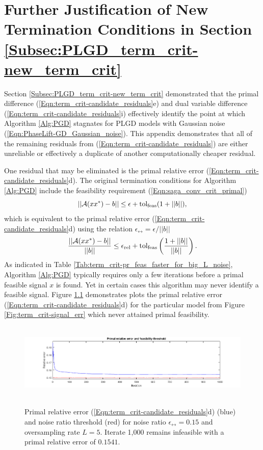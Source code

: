 \chapter{Further Justification of New Termination Conditions in Section \ref{Subsec:PLGD_term_crit-new_term_crit}}      		\label{Sec:Appx-further_reasons_for_new_term_crit}



Section \ref{Subsec:PLGD_term_crit-new_term_crit} demonstrated that the primal difference (\ref{Eqn:term_crit-candidate_residuals}e) and dual variable difference (\ref{Eqn:term_crit-candidate_residuals}i) effectively identify the point at which Algorithm \ref{Alg:PGD} stagnates for PLGD models with Gaussian noise (\ref{Eqn:PhaseLift-GD_Gaussian_noise}).  
This appendix demonstrates that all of the remaining residuals from  (\ref{Eqn:term_crit-candidate_residuals}) are either unreliable or effectively a duplicate of another computationally cheaper residual.  

One residual that may be eliminated is the primal relative error (\ref{Eqn:term_crit-candidate_residuals}d).  The original termination conditions for Algorithm \ref{Alg:PGD} include the feasibility requirement (\ref{Eqn:saga_conv_crit_primal}) 
\begin{equation*}
|| {\mathcal A}(xx^*) - b || \leq \epsilon + \textnormal{tol}_\textnormal{feas} (1 + ||b||),
\end{equation*}
which is equivalent to the primal relative error (\ref{Eqn:term_crit-candidate_residuals}d) using the relation $\epsilon_\rel = \epsilon / ||b||$
\begin{equation}
	\label{Eqn:GD_new_termination_conds-primal_feas}
\frac{||{\mathcal A}(xx^*) - b||}{||b||}  \leq \epsilon_{\textnormal{rel}} + \textnormal{tol}_\textnormal{feas} \left(\frac{1 + ||b||}{||b||}\right).
\end{equation}
As indicated in Table \ref{Tab:term_crit-pr_feas_faster_for_big_L_noise}, Algorithm \ref{Alg:PGD} typically requires only a few iterations before a primal feasible signal $x$ is found.  Yet in certain cases this algorithm may never identify a feasible signal.  Figure \ref{Fig:term_crit-pr_err_fails} demonstrates plots the primal relative error (\ref{Eqn:term_crit-candidate_residuals}d) for the particular model from Figure \ref{Fig:term_crit-signal_err} which never attained primal feasibility.

\begin{figure}[H]
\centering
\hbox{\hspace{-1.6cm} \includegraphics[scale=0.6]{term_crit-pr_err_fails} }
\caption{Primal relative error (\ref{Eqn:term_crit-candidate_residuals}d) (blue) and noise ratio threshold (red) for noise ratio $\epsilon_\rel = 0.15$ and oversampling rate $L = 5$.  Iterate 1,000 remains infeasible with a primal relative error of $0.1541$.}
\label{Fig:term_crit-pr_err_fails}
\end{figure}


